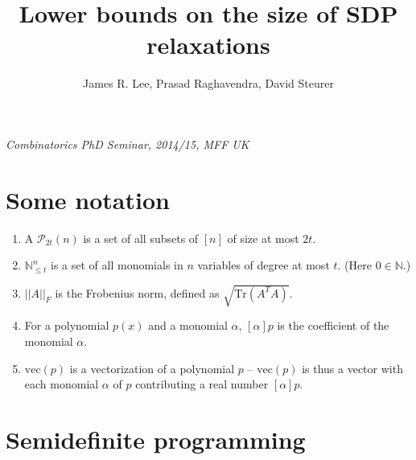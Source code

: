 \newcommand{\paren}[1]{(#1)}
\newcommand{\Paren}[1]{\left(#1\right)}
\newcommand{\bigparen}[1]{\big(#1\big)}
\newcommand{\Bigparen}[1]{\Big(#1\Big)}

\newcommand{\Ins}{\mathcal{I}}
\newcommand{\El}{\mathcal{L}}
\newcommand{\rank}{\textrm{rank}}
\newcommand{\psdrank}{\textrm{rk}_{\textrm{psd}}}
\newcommand{\degsos}{\textrm{deg}_{\textrm{sos}}}
\newcommand{\Corr}{\textsc{Corr}}
\newcommand{\Splus}{\mathcal{S}_+}
\newcommand{\Tr}{\textrm{Tr}}
\newcommand{\scalar}[2]{\langle #1, #2 \rangle}
\newcommand{\vectext}{\textrm{vec}}
\DeclareMathOperator{\val}{val}
\DeclareMathOperator*{\Cov}{Cov}


\long{}


\begin{multicols}{3}

\title{Lower bounds on the size of SDP relaxations}
\author{James R. Lee, Prasad Raghavendra, David Steurer}
\centerline{{\it Combinatorics PhD Seminar, 2014/15, MFF UK}}

\section{Some notation}

\begin{enumerate}
 \item A $\mathcal{P}_{2t}(n)$ is a set of all subsets of $[n]$ of size at most $2t$.
 \item $ℕ^n_{≤t}$ is a set of all monomials in $n$ variables of degree at most $t$. (Here $0 ∈ ℕ$.)
 \item $||A||_F$ is the Frobenius norm, defined as $\sqrt{\Tr(A^TA)}$.
 \item For a polynomial $p(x)$ and a monomial $α$, $[α]p$ is the coefficient of the monomial $α$.
 \item $\vectext(p)$ is a vectorization of a polynomial $p$ -- $\vectext(p)$ is thus a vector
 with each monomial $α$ of $p$ contributing a real number $[α]p$.
\end{enumerate}
\section{Semidefinite programming}



\end{multicols}

